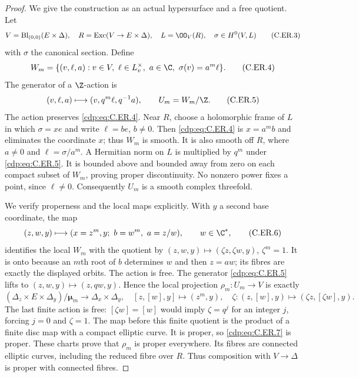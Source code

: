 \begin{proof}
We give the construction as an actual hypersurface and a free
quotient. Let
\[
 V=\operatorname{Bl}_{(0,0)}(E\times\Delta),\quad
 R=\operatorname{Exc}(V\to E\times\Delta),\quad
 L=\OO_V(R),\quad \sigma\in H^0(V,L)
                                                        \tag{C.ER.3}\label{cdp:eq:C.ER.3}
\]
with $\sigma$ the canonical section. Define
\[
 W_m=\{(v,\ell,a):v\in V,\ \ell\in L_v^\times,\ a\in\C,
                         \ \sigma(v)=a^m\ell\}.
                                                        \tag{C.ER.4}\label{cdp:eq:C.ER.4}
\]
The generator of a $\Z$-action is
\[
             (v,\ell,a)\longmapsto(v,q^m\ell,q^{-1}a),
 \qquad U_m=W_m/\Z.                               \tag{C.ER.5}\label{cdp:eq:C.ER.5}
\]
The action preserves \eqref{cdp:eq:C.ER.4}. Near $R$, choose a holomorphic frame
of $L$ in which $\sigma=xe$ and write $\ell=be$, $b\ne0$.
Then \eqref{cdp:eq:C.ER.4} is $x=a^m b$ and eliminates the coordinate $x$;
thus $W_m$ is smooth. It is also smooth off $R$, where $a\ne0$
and $\ell=\sigma/a^m$. A Hermitian norm on $L$ is multiplied by
$q^m$ under \eqref{cdp:eq:C.ER.5}. It is bounded above and bounded away from zero
on each compact subset of $W_m$, proving proper discontinuity.
No nonzero power fixes a point, since $\ell\ne0$. Consequently
$U_m$ is a smooth complex threefold.

We verify properness and the local maps explicitly. With $y$ a
second base coordinate, the map
\[
 (z,w,y)\longmapsto
 (x=z^m,y;\ b=w^m,\ a=z/w),\qquad w\in\C^*,
                                                        \tag{C.ER.6}\label{cdp:eq:C.ER.6}
\]
identifies the local $W_m$ with the quotient by
$(z,w,y)\mapsto(\zeta z,\zeta w,y)$, $\zeta^m=1$.
It is onto because an $m$th root of $b$ determines $w$ and then
$z=aw$; its fibres are exactly the displayed orbits. The action is
free. The generator \eqref{cdp:eq:C.ER.5} lifts to $(z,w,y)\mapsto(z,qw,y)$.
Hence the local projection $\rho_m:U_m\to V$ is exactly
\[
 (\Delta_z\times E\times\Delta_y)/\boldsymbol\mu_m
        \longrightarrow\Delta_x\times\Delta_y,
 \quad [z,[w],y]\longmapsto(z^m,y),
 \quad \zeta:(z,[w],y)\longmapsto(\zeta z,[\zeta w],y).
                                                        \tag{C.ER.7}\label{cdp:eq:C.ER.7}
\]
The last finite action is free: $[\zeta w]=[w]$ would imply
$\zeta=q^j$ for an integer $j$, forcing $j=0$ and $\zeta=1$.
The map before this finite quotient is the product of a finite
disc map with a compact elliptic curve. It is proper, so \eqref{cdp:eq:C.ER.7}
is proper. These charts prove that $\rho_m$ is proper everywhere.
Its fibres are connected elliptic curves, including the reduced
fibre over $R$. Thus composition with $V\to\Delta$ is proper
with connected fibres.


\end{proof}
